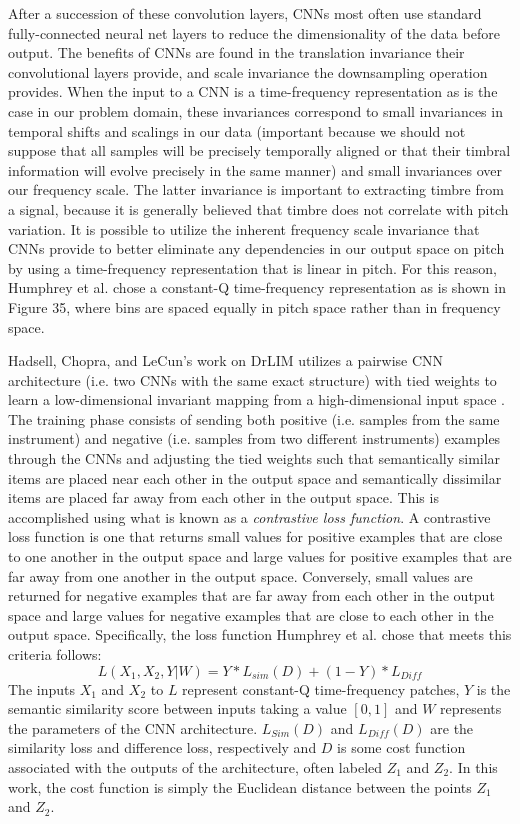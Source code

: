 \documentclass[12pt]{report} 	%
\numberwithin{figure}{chapter}
\numberwithin{table}{chapter}
\numberwithin{equation}{chapter}
\begin{document}
\begin{flushleft}
After a succession of these convolution layers, CNNs most often use standard fully-connected neural net layers to reduce the dimensionality of the data before output. The benefits of CNNs are found in the translation invariance their convolutional layers provide, and scale invariance the downsampling operation provides. When the input to a CNN is a time-frequency representation as is the case in our problem domain, these invariances correspond to small invariances in temporal shifts and scalings in our data (important because we should not suppose that all samples will be precisely temporally aligned or that their timbral information will evolve precisely in the same manner) and small invariances over our frequency scale. The latter invariance is important to extracting timbre from a signal, because it is generally believed that timbre does not correlate with pitch variation. It is possible to utilize the inherent frequency scale invariance that CNNs provide to better eliminate any dependencies in our output space on pitch by using a time-frequency representation that is linear in pitch. For this reason, Humphrey et al. chose a constant-Q time-frequency representation as is shown in Figure 35, where bins are spaced equally in pitch space rather than in frequency space.

Hadsell, Chopra, and LeCun's work on DrLIM utilizes a pairwise CNN architecture (i.e. two CNNs with the same exact structure) with tied weights to learn a low-dimensional invariant mapping from a high-dimensional input space \cite{hadsell2006dimensionality}. The training phase consists of sending both positive (i.e. samples from the same instrument) and negative (i.e. samples from two different instruments) examples through the CNNs and adjusting the tied weights such that semantically similar items are placed near each other in the output space and semantically dissimilar items are placed far away from each other in the output space. This is accomplished using what is known as a \textit{contrastive loss function}. A contrastive loss function is one that returns small values for positive examples that are close to one another in the output space and large values for positive examples that are far away from one another in the output space. Conversely, small values are returned for negative examples that are far away from each other in the output space and large values for negative examples that are close to each other in the output space. Specifically, the loss function Humphrey et al. chose that meets this criteria follows:
\begin{equation}
L(X_1, X_2, Y|W)=Y*L_{sim}(D)+(1-Y)*L_{Diff}
\end{equation}
The inputs $X_1$ and $X_2$ to $L$ represent constant-Q time-frequency patches, $Y$ is the semantic similarity score between inputs taking a value $[0,1]$ and $W$ represents the parameters of the CNN architecture. $L_{Sim}(D)$ and $L_{Diff}(D)$ are the similarity loss and difference loss, respectively and $D$ is some cost function associated with the outputs of the architecture, often labeled $Z_1$ and $Z_2$. In this work, the cost function is simply the Euclidean distance between the points $Z_1$ and $Z_2$.


\end{flushleft}
\end{document}
